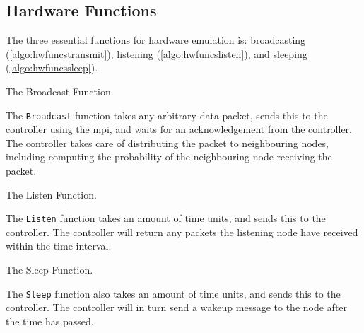 
\subsection{Hardware Functions}\label{sec:hwfuncspseudo}
The three essential functions for hardware emulation is: broadcasting (\autoref{algo:hwfuncstransmit}), listening (\autoref{algo:hwfuncslisten}), and sleeping (\autoref{algo:hwfuncssleep}).
  
\begin{algorithm}[ht]
    \DontPrintSemicolon
    
    \caption{The Broadcast Function.}
    \label{algo:hwfuncstransmit}
\end{algorithm}

The \texttt{Broadcast} function takes any arbitrary data packet, sends this to the controller using the \gls{mpi}, and waits for an acknowledgement from the controller. The controller takes care of distributing the packet to neighbouring nodes, including computing the probability of the neighbouring node receiving the packet.

\begin{algorithm}[ht]
    \DontPrintSemicolon
    
    
    \caption{The Listen Function.}
    \label{algo:hwfuncslisten}
\end{algorithm}

The \texttt{Listen} function takes an amount of time units, and sends this to the controller. The controller will return any packets the listening node have received within the time interval.

\begin{algorithm}[ht]
    \DontPrintSemicolon
    
    
    \caption{The Sleep Function.}
    \label{algo:hwfuncssleep}
\end{algorithm}

The \texttt{Sleep} function also takes an amount of time units, and sends this to the controller. The controller will in turn send a wakeup message to the node after the time has passed.
